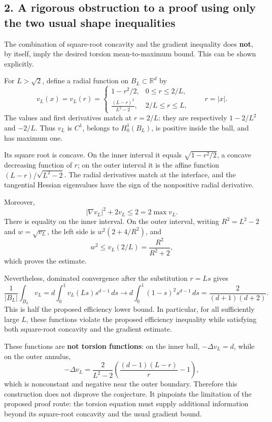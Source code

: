 \documentclass[11pt,a4paper]{article}
\begin{document}
\subsection{2. A rigorous obstruction to a proof using only the two usual shape inequalities}

The combination of square-root concavity and the gradient inequality does \textbf{not}, by itself, imply the desired torsion mean-to-maximum bound. This can be shown explicitly.

For \(L>\sqrt2\), define a radial function on \(B_L\subset\mathbb R^d\) by
\[
v_L(x)=v_L(r)=
\begin{cases}
1-r^2/2,&0\le r\le 2/L,\\[2mm]
\displaystyle\frac{(L-r)^2}{L^2-2},&2/L\le r\le L,
\end{cases}
\qquad r=|x|.
\]
The values and first derivatives match at \(r=2/L\): they are respectively \(1-2/L^2\) and \(-2/L\). Thus \(v_L\) is \(C^1\), belongs to \(H^1_0(B_L)\), is positive inside the ball, and has maximum one.

Its square root is concave. On the inner interval it equals \(\sqrt{1-r^2/2}\), a concave decreasing function of \(r\); on the outer interval it is the affine function \((L-r)/\sqrt{L^2-2}\). The radial derivatives match at the interface, and the tangential Hessian eigenvalues have the sign of the nonpositive radial derivative.

Moreover,
\[
|\nabla v_L|^2+2v_L\le2=2\max v_L.
\]
There is equality on the inner interval. On the outer interval, writing \(R^2=L^2-2\) and \(w=\sqrt{v_L}\), the left side is \(w^2(2+4/R^2)\), and
\[
w^2\le v_L(2/L)=\frac{R^2}{R^2+2},
\]
which proves the estimate.

Nevertheless, dominated convergence after the substitution \(r=Ls\) gives
\[
\frac{1}{|B_L|}\int_{B_L}v_L
=d\int_0^1v_L(Ls)s^{d-1}\,ds
\longrightarrow
d\int_0^1(1-s)^2s^{d-1}\,ds
=\frac{2}{(d+1)(d+2)}.
\]
This is half the proposed efficiency lower bound. In particular, for all sufficiently large \(L\), these functions violate the proposed efficiency inequality while satisfying both square-root concavity and the gradient estimate.

These functions are \textbf{not torsion functions}: on the inner ball, \(-\Delta v_L=d\), while on the outer annulus,
\[
-\Delta v_L
=\frac{2}{L^2-2}\left(\frac{(d-1)(L-r)}{r}-1\right),
\]
which is nonconstant and negative near the outer boundary. Therefore this construction does not disprove the conjecture. It pinpoints the limitation of the proposed proof route: the torsion equation must supply additional information beyond its square-root concavity and the usual gradient bound.
\end{document}
